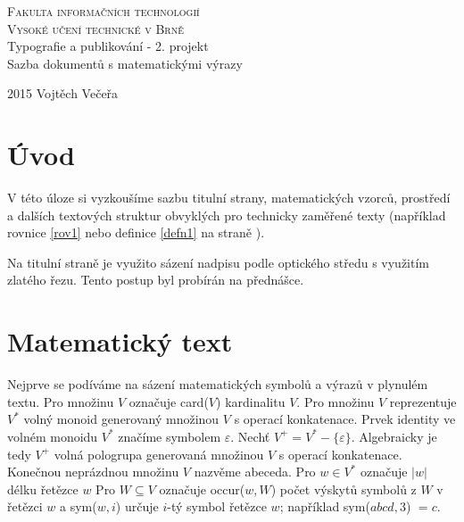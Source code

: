 \documentclass[11pt,a4paper,twocolumn]{article}
\theoremstyle{definition}
\theoremstyle{lemma}
\begin{document}
\begin{titlepage}
  \begin{center}

    \textsc{\Huge Fakulta informačních technologií\\Vysoké učení technické v Brně}\\
    \LARGE Typografie a publikování - 2. projekt\\Sazba dokumentů s
    matematickými výrazy\\
  \end{center}
  {\Large 2015 \hfill Vojtěch Večeřa}
\end{titlepage}

\section*{Úvod}
\label{uvod}
\noindent V této úloze si vyzkoušíme sazbu titulní strany, matematických vzorců, prostředí a
dalších textových struktur obvyklých pro technicky zaměřené texty (například rovnice \ref{rov1}
nebo definice \ref{defn1} na straně \pageref{defn1}).

\indent Na titulní straně je využito sázení nadpisu podle optického středu s využitím zlatého řezu. Tento postup byl probírán na přednášce.

\section{Matematický text}
\label{mattext}
\noindent Nejprve se podíváme na sázení matematických symbolů a výrazů v plynulém textu. Pro
množinu $V$ označuje card($V$) kardinalitu $V$. Pro množinu $V$ reprezentuje $V^*$ volný monoid
generovaný množinou $V$ s operací konkatenace.
Prvek identity ve volném monoidu $V^*$ značíme symbolem $\varepsilon$.
Nechť $V^+ =V^*-\{\varepsilon\}$. Algebraicky je tedy $V^+$ volná pologrupa generovaná množinou
$V$ s operací konkatenace. Konečnou neprázdnou množinu $V$ nazvěme abeceda.
Pro $w \in V^*$ označuje $|w|$ délku řetězce $w$ Pro $W \subseteq V$ označuje occur($w, W$) počet
výskytů symbolů z $W$ v řetězci $w$ a sym($w, i$) určuje $i$-tý symbol řetězce $w$; například
sym($abcd, 3$) $= c$.
\end{document}
